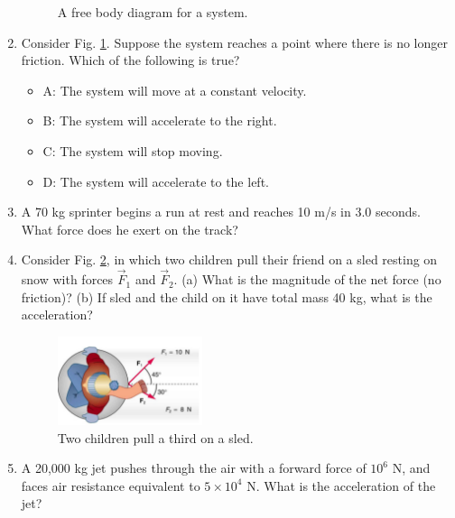 \documentclass[10pt]{article}
\begin{document}
\begin{enumerate}
\begin{figure}[h]
\caption{\label{fig:fbd1} A free body diagram for a system.}
\end{figure}
\clearpage
\item Consider Fig. \ref{fig:fbd1}.  Suppose the system reaches a point where there is no longer friction.  Which of the following is true?
\begin{itemize}
\item A: The system will move at a constant velocity.
\item B: The system will accelerate to the right.
\item C: The system will stop moving.
\item D: The system will accelerate to the left.
\end{itemize}
\item A 70 kg sprinter begins a run at rest and reaches 10 m/s in 3.0 seconds.  What force does he exert on the track? \\ \vspace{2.0cm}
\item Consider Fig. \ref{fig:sled}, in which two children pull their friend on a sled resting on snow with forces $\vec{F}_1$ and $\vec{F}_2$.  (a) What is the magnitude of the net force (no friction)? (b) If sled and the child on it have total mass 40 kg, what is the acceleration? \\ \vspace{2.5cm}
\begin{figure}[h]
\centering
\includegraphics[width=0.4\textwidth]{figures/sled.png}
\caption{\label{fig:sled} Two children pull a third on a sled.}
\end{figure}
\item A 20,000 kg jet pushes through the air with a forward force of $10^6$ N, and faces air resistance equivalent to $5 \times 10^4$ N.  What is the acceleration of the jet? \\ \vspace{2cm}
\end{enumerate}
\end{document}
